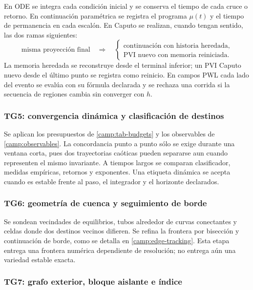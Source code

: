En ODE se integra cada condición inicial y se conserva el tiempo de cada cruce
o retorno. En continuación paramétrica se registra el programa
\(\mu(t)\) y el tiempo de permanencia en cada escalón. En Caputo se realizan,
cuando tengan sentido, las dos ramas siguientes:
\begin{equation}
 \text{misma proyección final}\quad\Longrightarrow\quad
 \begin{cases}
   \text{continuación con historia heredada},\\
   \text{PVI nuevo con memoria reiniciada}.
 \end{cases}
 \label{camp:eq-history-pair}
\end{equation}
La memoria heredada se reconstruye desde el terminal inferior; un PVI Caputo
nuevo desde el último punto se registra como reinicio. En campos PWL cada lado del
evento se evalúa con su fórmula declarada y se rechaza una corrida si la
secuencia de regiones cambia sin converger con \(h\).

\subsubsection*{TG5: convergencia dinámica y clasificación de destinos}

Se aplican los presupuestos de \cref{camp:tab-budgets} y los observables de
\cref{camp:observables}. La concordancia punto a punto sólo se exige durante
una ventana corta, pues dos trayectorias caóticas pueden separarse aun cuando
representen el mismo invariante. A tiempos largos se comparan clasificador,
medidas empíricas, retornos y exponentes. Una etiqueta dinámica se acepta
cuando es estable frente al paso, el integrador y el horizonte declarados.

\ifHAFOBasinMaterial
\subsubsection*{TG6: geometría de cuenca y seguimiento de borde}

Se sondean vecindades de equilibrios, tubos alrededor de curvas conectantes y
celdas donde dos destinos vecinos difieren. Se refina la frontera por
bisección y continuación de borde, como se detalla en
\cref{camp:edge-tracking}. Esta etapa entrega una frontera numérica dependiente
de resolución; no entrega aún una variedad estable exacta.
\fi

\subsubsection*{TG7: grafo exterior, bloque aislante e índice}

